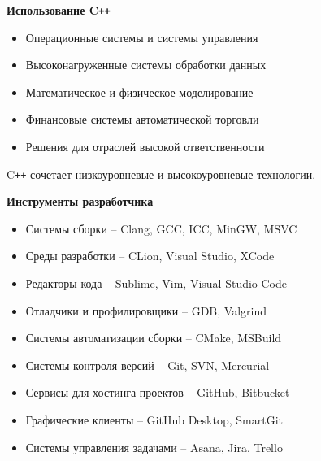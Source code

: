 \documentclass{beamer} %
\begin{document}
\begin{frame}{\bf Использование C\texttt{++}}
    
    \begin{itemize}

        \item Операционные системы и системы управления

        \item Высоконагруженные системы обработки данных

        \item Математическое и физическое моделирование

        \item Финансовые системы автоматической торговли

        \item Решения для отраслей высокой ответственности
        
    \end{itemize}

    \begin{block}
    \justifying C\texttt{++} сочетает низкоуровневые и высокоуровневые технологии.
    \end{block}
    
\end{frame}

\begin{frame}{\bf Инструменты разработчика}

    \begin{itemize}

        \item Системы сборки -- Clang, GCC, ICC, MinGW, MSVC

        \item Среды разработки -- CLion, Visual Studio, XCode

        \item Редакторы кода -- Sublime, Vim, Visual Studio Code

        \item Отладчики и профилировщики -- GDB, Valgrind

        \item Системы автоматизации сборки -- CMake, MSBuild

        \item Системы контроля версий -- Git, SVN, Mercurial

        \item Сервисы для хостинга проектов -- GitHub, Bitbucket

        \item Графические клиенты -- GitHub Desktop, SmartGit

        \item Системы управления задачами -- Asana, Jira, Trello

    \end{itemize}
    
\end{frame}
\end{document}
